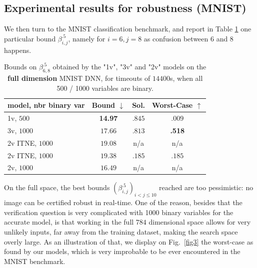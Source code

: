 	\subsection{Experimental results for robustness (MNIST)}
	
We then turn to the MNIST classification benchmark, and report 
in Table \ref{table.mnist} one particular bound $\beta^{.5}_{i,j}$, namely for $i=6,j=8$ as confusion between 6 and 8 happens.
	
	\begin{table}[h!]
		\centering
	\begin{tabular}{||l||c|c|c||}\hline\hline
		model, nbr binary var &        Bound $\downarrow$ &  Sol. &      Worst-Case $\uparrow$ \\\hline \hline
		1v, $500$ & {\bf 14.97} & $.845$ & $.009$ \\\hline 
		3v, $1000$ & $17.66$ & $.813$ & {\bf .518} \\\hline 
		2v ITNE, $1000$ & $19.08$ & n/a & n/a \\\hline 
		2v ITNE, $1000$ & $19.38$ & $.185$ & $.185$ \\\hline 
	    2v, $1000$ & $16.49$ & n/a & n/a \\\hline\hline	 
	\end{tabular}
	\caption{Bounds on $\beta^{.5}_{6,8}$ 
	obtained by the "1v", "3v" and "2v" models 
	on the {\bf full dimension} MNIST DNN, 
	for timeouts of $14400$s, when all 500 / 1000 variables are binary.}
	\label{table.mnist}
\end{table}

On the full space, the best bounds $(\beta^{.5}_{i,j})_{i < j \leq 10}$ reached are too pessimistic: no image can be certified robust in real-time. One of the reason, besides that the verification question is very complicated with 1000 binary variables for the accurate model, is that working in the full $784$ dimensional space allows for very unlikely inputs, far away from the training dataset, making the search space overly large. As an illustration of that, we display on Fig.~\ref{fig3} the worst-case as found by our models, which is very improbable to be ever encountered in the MNIST benchmark.

